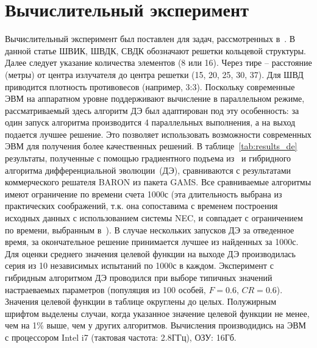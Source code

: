 \section{Вычислительный эксперимент}\label{sec:exp:de}
Вычислительный эксперимент был поставлен для задач, рассмотренных в~\cite{tyu:daor,tyunin:oniip}. В данной
статье ШВИК, ШВДК, СВДК обозначают решетки кольцевой структуры. Далее следует указание количества элементов (8 или 16).
Через тире -- расстояние (метры) от центра излучателя до центра решетки (15, 20, 25, 30, 37). Для ШВД приводится плотность противовесов (например, 3:3). Поскольку современные ЭВМ на аппаратном уровне поддерживают вычисление в параллельном режиме, рассматриваемый здесь алгоритм ДЭ был адаптирован под эту особенность: за один запуск алгоритма производится 4 параллельных выполнения, а на выход подается лучшее решение. Это позволяет использовать возможности современных ЭВМ для получения более качественных решений.
В таблице~\ref{tab:results_de} результаты, полученные с помощью градиентного подъема из~\cite{tyu:daor} и гибридного алгоритма дифференциальной эволюции~(ДЭ),
сравниваются с результатами коммерческого решателя BARON из пакета GAMS.
Все сравниваемые алгоритмы имеют ограничение по времени счета 1000с (эта длительность выбрана из практических соображений, т.к. она сопоставима с временем построения исходных данных с использованием системы NEC, и совпадает с ограничением по времени, выбранным в~\cite{tyu:daor}).
В случае нескольких запусков ДЭ за отведенное время, за окончательное решение принимается лучшее из найденных за 1000с.
Для оценки среднего значения целевой функции на выходе ДЭ производилась серия из 10 независимых испытаний по
1000с в каждом. Эксперимент с гибридным алгоритмом ДЭ проводился при выборе типичных значений настраеваемых параметров
(популяция из 100 особей, $F=0.6$, $CR=0.6$). Значения целевой функции в таблице округлены до целых.
Полужирным шрифтом выделены случаи, когда указанное значение целевой функции не менее, чем на 1\% выше, чем у других алгоритмов.
Вычисления производидись на ЭВМ с процессором Intel i7 (тактовая частота: 2.8ГГц), ОЗУ: 16Гб.

